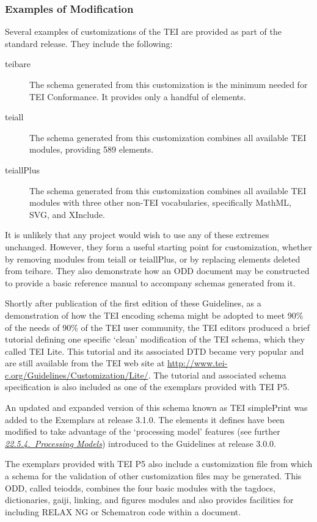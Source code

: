 \subsubsection[{Examples of Modification }]{Examples of Modification }\label{MDlite}\par
Several examples of customizations of the TEI are provided as part of the standard release. They include the following: \begin{description}

\item[{tei\textunderscore bare}]The schema generated from this customization is the minimum needed for TEI Conformance. It provides only a handful of elements. 
\item[{tei\textunderscore all}]The schema generated from this customization combines all available TEI modules, providing 589 elements.
\item[{tei\textunderscore allPlus}]The schema generated from this customization combines all available TEI modules with three other non-TEI vocabularies, specifically MathML, SVG, and XInclude.
\end{description} \par
It is unlikely that any project would wish to use any of these extremes unchanged. However, they form a useful starting point for customization, whether by removing modules from tei\textunderscore all or tei\textunderscore allPlus, or by replacing elements deleted from tei\textunderscore bare. They also demonstrate how an ODD document may be constructed to provide a basic reference manual to accompany schemas generated from it.\par
Shortly after publication of the first edition of these Guidelines, as a demonstration of how the TEI encoding schema might be adopted to meet 90\% of the needs of 90\% of the TEI user community, the TEI editors produced a brief tutorial defining one specific ‘clean’ modification of the TEI schema, which they called TEI Lite. This tutorial and its associated DTD became very popular and are still available from the TEI web site at \url{http://www.tei-c.org/Guidelines/Customization/Lite/}. The tutorial and associated schema specification is also included as one of the exemplars provided with TEI P5.\par
An updated and expanded version of this schema known as \textsf{TEI simplePrint} was added to the Exemplars at release 3.1.0. The elements it defines have been modified to take advantage of the ‘processing model’ features (see further \textit{\hyperref[TDPM]{22.5.4.\ Processing Models}}) introduced to the Guidelines at release 3.0.0.\par
The exemplars provided with TEI P5 also include a customization file from which a schema for the validation of other customization files may be generated. This ODD, called tei\textunderscore odds, combines the four basic modules with the tagdocs, dictionaries, gaiji, linking, and figures modules and also provides facilities for including RELAX NG or Schematron code within a document. 
